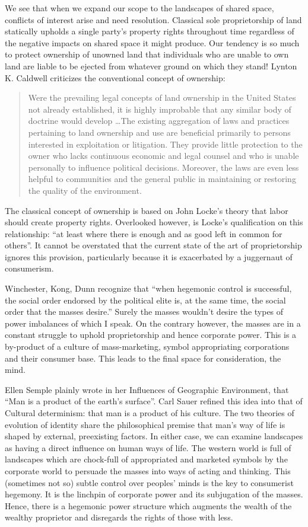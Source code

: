 \documentclass[12pt, letterpaper, oneside]{article}
\begin{document}
We see that when we expand our scope to the landscapes of shared space, conflicts of interest arise and need resolution. Classical sole proprietorship of land statically upholds a single party's property rights throughout time regardless of the negative impacts on shared space it might produce. Our tendency is so much to protect ownership of unowned land that individuals who are unable to own land are liable to be ejected from whatever ground on which they stand! Lynton K. Caldwell criticizes the conventional concept of ownership:
\begin{quote}
Were the prevailing legal concepts of land ownership in the United States not already established, it is highly improbable that any similar body of doctrine would develop \ldots The existing aggregation of laws and practices pertaining to land ownership and use are beneficial primarily to persons interested in exploitation or litigation. They provide little protection to the owner who lacks continuous economic and legal counsel and who is unable personally to influence political decisions. Moreover, the laws are even less helpful to communities and the general public in maintaining or restoring the quality of the environment.
\end{quote}
The classical concept of ownership is based on John Locke's theory that labor should create property rights. Overlooked however, is Locke's qualification on this relationship: ``at least where there is enough and as good left in common for others''. It cannot be overstated that the current state of the art of proprietorship ignores this provision, particularly because it is exacerbated by a juggernaut of consumerism.

Winchester, Kong, Dunn recognize that ``when hegemonic control is successful, the social order endorsed by the political elite is, at the same time, the social order that the masses desire.'' Surely the masses wouldn't desire the types of power imbalances of which I speak. On the contrary however, the masses are in a constant struggle to uphold proprietorship and hence corporate power. This is a by-product of a culture of mass-marketing, symbol appropriating corporations and their consumer base. This leads to the final space for consideration, the mind.

Ellen Semple plainly wrote in her Influences of Geographic Environment, that ``Man is a product of the earth's surface''. Carl Sauer refined this idea into that of Cultural determinism: that man is a product of his culture. The two theories of evolution of identity share the philosophical premise that man's way of life is shaped by external, preexisting factors. In either case, we can examine landscapes as having a direct influence on human ways of life. The western world is full of landscapes which are chock-full of appropriated and marketed symbols by the corporate world to persuade the masses into ways of acting and thinking. This (sometimes not so) subtle control over peoples' minds is the key to consumerist hegemony. It is the linchpin of corporate power and its subjugation of the masses. Hence, there is a hegemonic power structure which augments the wealth of the wealthy proprietor and disregards the rights of those with less. 
\end{document}
